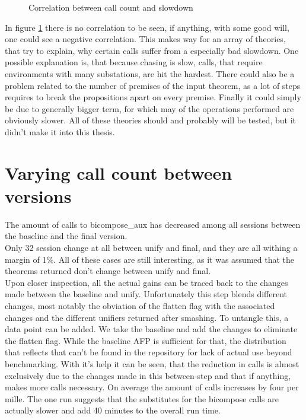 \begin{figure}[ht]
\centering
\caption{Correlation between call count and slowdown}
\label{fig:correlation}
\end{figure}

In figure \ref{fig:correlation} there is no correlation to be seen, if anything, with some good will, one could see a negative correlation. This makes way for an array of theories, that try to explain, why certain calls suffer from a especially bad slowdown. One possible explanation is, that because chasing is slow, calls, that require environments with many substations, are hit the hardest. There could also be a problem related to the number of premises of the input theorem, as a lot of steps requires to break the propositions apart on every premise. Finally it could simply be due to generally bigger term, for which may of the operations performed are obviously slower. All of these theories should and probably will be tested, but it didn't make it into this thesis.

\section{Varying call count between versions}

The amount of calls to bicompose\_aux has decreased among all sessions between the baseline and the final version.\\
Only 32 session change at all between unify and final, and they are all withing a margin of 1\%. All of these cases are still interesting, as it was assumed that the theorems returned don't change between unify and final.\\
Upon closer inspection, all the actual gains can be traced back to the changes made between the baseline and unify. Unfortunately this step blends different changes, most notably the obviation of the flatten flag with the associated changes and the different unifiers returned after smashing. To untangle this, a data point can be added. We take the baseline and add the changes to eliminate the flatten flag. While the baseline AFP is sufficient for that, the distribution that reflects that can't be found in the repository for lack of actual use beyond benchmarking. With it's help it can be seen, that the reduction in calls is almost exclusively due to the changes made in this between-step and that if anything, makes more calls necessary. On average the amount of calls increases by four per mille. The one run suggests that the substitutes for the bicompose calls are actually slower and add 40 minutes to the overall run time.